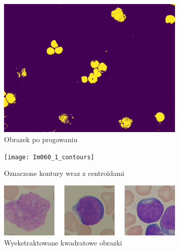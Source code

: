 \begin{figure}
    \centering
    \includegraphics[width=0.8\textwidth]{Im060_1_thresh}
    \caption{Obrazek po progowaniu}
    \label{fig:extract_thresh}
\end{figure}

\begin{figure}
    \centering
    \texttt{[image: Im060\_1\_contours]}
    \caption{Oznaczone kontury wraz z centroidami}
    \label{fig:extract_contours}
\end{figure}

\begin{figure}
    \centering
    \includegraphics[width=0.8\textwidth]{cells}
    \caption{Wyekstraktowane kwadratowe obrazki}
    \label{fig:extract_squares}
\end{figure}

